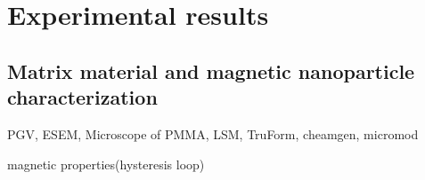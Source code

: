 % 



\section{Experimental results}
\label{sec:exp_res}

\subsection{Matrix material and magnetic nanoparticle characterization}
\label{subsec:mat_mag_char_res}
PGV, ESEM, Microscope of PMMA, LSM, TruForm, cheamgen, micromod

magnetic properties(hysteresis loop)

